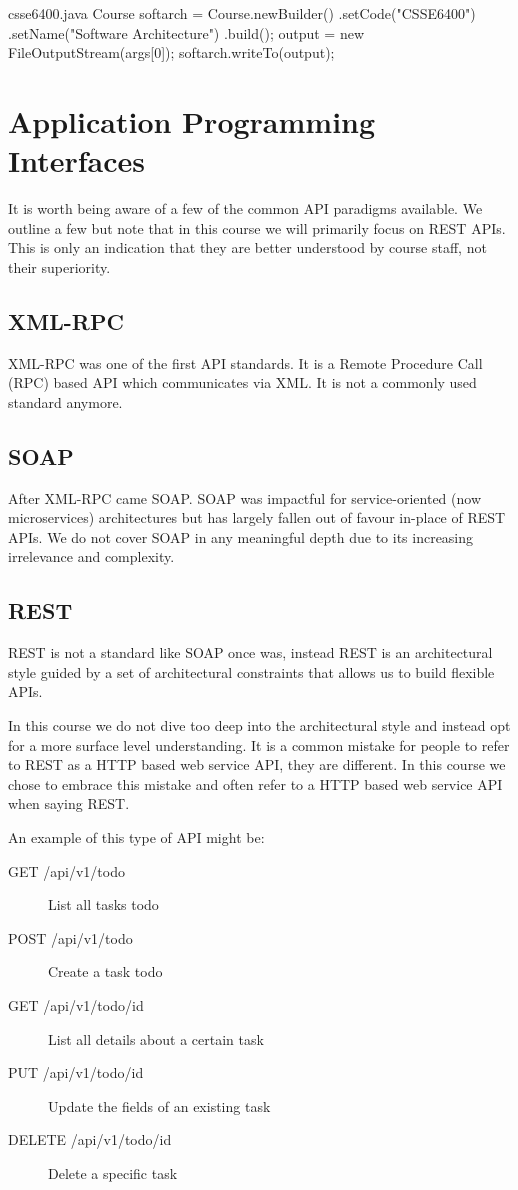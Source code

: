 \documentclass{csse4400}
\begin{document}
\begin{code}[language=java]{csse6400.java}
Course softarch = Course.newBuilder()
    .setCode("CSSE6400")
    .setName("Software Architecture")
    .build();
output = new FileOutputStream(args[0]);
softarch.writeTo(output);
\end{code}

\section{Application Programming Interfaces}
It is worth being aware of a few of the common API paradigms available.
We outline a few but note that in this course we will primarily focus on REST APIs.
This is only an indication that they are better understood by course staff,
not their superiority.

\subsection{XML-RPC}
XML-RPC was one of the first API standards.
It is a Remote Procedure Call (RPC) based API which communicates via XML.
It is not a commonly used standard anymore.

\subsection{SOAP}
After XML-RPC came SOAP.
SOAP was impactful for service-oriented (now microservices) architectures but has largely fallen out of favour in-place of REST APIs.
We do not cover SOAP in any meaningful depth due to its increasing irrelevance and complexity.

\subsection{REST}
REST is not a standard like SOAP once was,
instead REST is an architectural style guided by a set of architectural constraints that allows us to build flexible APIs.

In this course we do not dive too deep into the architectural style and instead opt for a more surface level understanding.
It is a common mistake for people to refer to REST as a HTTP based web service API,
they are different.
In this course we chose to embrace this mistake and often refer to a HTTP based web service API when saying REST.

\noindent An example of this type of API might be:
\begin{description}
  \item[GET /api/v1/todo] List all tasks todo
  \item[POST /api/v1/todo] Create a task todo
  \item[GET /api/v1/todo/{id}] List all details about a certain task
  \item[PUT /api/v1/todo/{id}] Update the fields of an existing task
  \item[DELETE /api/v1/todo/{id}] Delete a specific task
\end{description}
\end{document}
